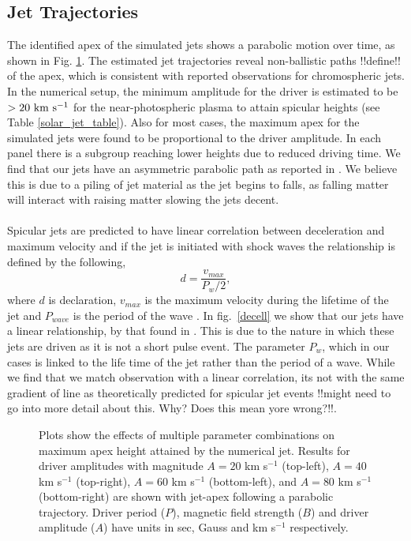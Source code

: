 \documentclass[12pt]{ociamthesis}
\newcommand{\np}{\\ \\}
\begin{document}
\subsection{Jet Trajectories}
\label{subsec:jet_traj}
The identified apex of the simulated jets shows a parabolic motion over time, as shown in Fig. \ref{jet_traj}. The estimated jet trajectories reveal non-ballistic paths {\color{green}!!define!!} of the apex, which is consistent with reported observations \citep{Hansteen2006ApJ, Rouppe2007ApJ660L169R, Pontieu2007PASJ} for chromospheric jets. In the numerical setup, the minimum amplitude for the driver is estimated to be $>20 ~\rm{km ~s^{-1}}$ for the near-photospheric plasma to attain spicular heights (see Table \ref{solar_jet_table}). Also for most cases, the maximum apex for the simulated jets were found to be proportional to the driver amplitude. In each panel there is a subgroup reaching lower heights due to reduced driving time. We find that our jets have an asymmetric parabolic path as reported in \cite{Singh2019}. We believe this is due to a piling of jet material as the jet begins to falls, as falling matter will interact with raising matter slowing the jets decent.
\np  
%
Spicular jets are predicted to have linear correlation between deceleration and maximum velocity and if the jet is initiated with shock waves the relationship is defined by the following,
\begin{equation} \label{trend_heg}
d = \frac{v_{max}}{P_{w}/2},
\end{equation}
where $d$ is declaration, $v_{max}$ is the maximum velocity during the lifetime of the jet and $P_{wave}$ is the period of the wave \citep{Heggland2007ApJ6661277H}. In fig.~\ref{decell} we show that our jets have a linear relationship, by that found in \citep{Heggland2007ApJ6661277H}. This is due to the nature in which these jets are driven as it is not a short pulse event. The parameter $P_{w}$, which in our cases is linked to the life time of the jet rather than the period of a wave. While we find that we match observation with a linear correlation, its not with the same gradient of line as theoretically predicted for spicular jet events {\color{green}!!might need to go into more detail about this. Why? Does this mean yore wrong?!!}.
\begin{figure}
\captionsetup[subfigure]{labelformat=empty}
\centering
{} 
\caption{Plots show the effects of multiple parameter combinations on maximum apex height attained by the numerical jet. Results for driver amplitudes with magnitude $A = 20$ km s$^{-1}$ (top-left), $A = 40$ km s$^{-1}$ (top-right), $A = 60$ km s$^{-1}$ (bottom-left), and $A = 80$ km s$^{-1}$ (bottom-right) are shown with jet-apex following a parabolic trajectory. Driver period ($P$), magnetic field strength ($B$) and driver amplitude ($A$) have units in sec, Gauss and km s$^{-1}$ respectively.}
\label{jet_traj}
\end{figure}
\end{document}
